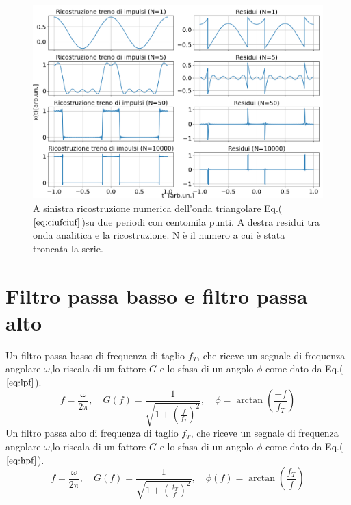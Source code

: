 \documentclass{article}
\begin{document}
    \begin{figure}[H]
        \centering
        \includegraphics[width=1\textwidth]{foupulsetrainwave1e5.png} %
        \caption{A sinistra ricostruzione numerica dell'onda triangolare
        Eq.($\ref{eq:ciufciuf}$)su due periodi con centomila punti.
        A destra residui tra onda analitica e la ricostruzione.
        N è il numero a cui è stata troncata la serie. }
        \label{fig:ciufciuf2}
    \end{figure}

\section{Filtro passa basso e filtro passa alto}
\label{sez:filt}
Un filtro passa basso di frequenza di taglio $f_T$, che riceve un segnale di 
frequenza angolare $\omega$,lo riscala di un fattore $G$ e lo sfasa di un 
angolo $\phi$ come dato da Eq.($\ref{eq:lpf}$).
    \begin{equation}
        f = \frac{\omega}{2\pi}, \quad 
        G(f) = \frac{1}{\sqrt{1 + \left(\frac{f}{f_T}\right)^2}}, \quad 
        \phi = \arctan\left(\frac{-f}{f_T}\right)
        \label{eq:lpf}
    \end{equation}
Un filtro passa alto di frequenza di taglio $f_T$, che riceve un segnale di 
frequenza angolare $\omega$,lo riscala di un fattore $G$ e lo sfasa di un 
angolo $\phi$ come dato da Eq.($\ref{eq:hpf}$).
    \begin{equation}
        f = \frac{\omega}{2\pi}, \quad 
        G(f) = \frac{1}{\sqrt{1 + \left(\frac{f_T}{f}\right)^2}}, \quad 
        \phi(f)= \arctan\left(\frac{f_T}{f}\right)
        \label{eq:hpf}
    \end{equation}
\end{document}
